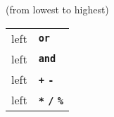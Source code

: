 \renewcommand{\t}[1]{\texttt{\textbf{#1}}}

\begin{center}
    (from lowest to highest)\\
    \begin{tabular}{cl}
        left & \t{or} \\
        left & \t{and} \\
        left & \t{+} \t{-} \\
        left & \t{*} \t{/} \t{\%} \\
    \end{tabular}
\end{center}

